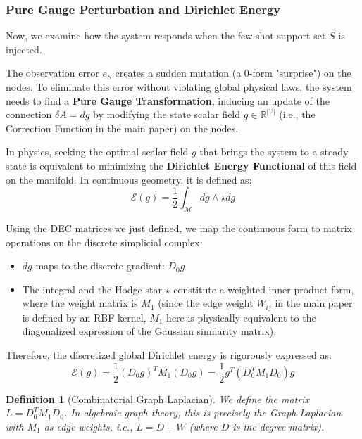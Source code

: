 \documentclass{article}
\newtheorem{definition}{Definition}[section]
\begin{document}
\subsubsection{Pure Gauge Perturbation and Dirichlet Energy}

Now, we examine how the system responds when the few-shot support set $S$ is injected.

The observation error $e_S$ creates a sudden mutation (a 0-form "surprise") on the nodes. To eliminate this error without violating global physical laws, the system needs to find a \textbf{Pure Gauge Transformation}, inducing an update of the connection $\delta A = d g$ by modifying the state scalar field $g \in \mathbb{R}^{|\mathcal{V}|}$ (i.e., the Correction Function in the main paper) on the nodes.

In physics, seeking the optimal scalar field $g$ that brings the system to a steady state is equivalent to minimizing the \textbf{Dirichlet Energy Functional} of this field on the manifold. In continuous geometry, it is defined as:
\begin{equation}
\mathcal{E}(g) = \frac{1}{2} \int_{\mathcal{M}} d g \wedge \star d g
\end{equation}

Using the DEC matrices we just defined, we map the continuous form to matrix operations on the discrete simplicial complex:
\begin{itemize}
    \item $d g$ maps to the discrete gradient: $D_0 g$
    \item The integral and the Hodge star $\star$ constitute a weighted inner product form, where the weight matrix is $M_1$ (since the edge weight $W_{ij}$ in the main paper is defined by an RBF kernel, $M_1$ here is physically equivalent to the diagonalized expression of the Gaussian similarity matrix).
\end{itemize}

Therefore, the discretized global Dirichlet energy is rigorously expressed as:
\begin{equation}
\mathcal{E}(g) = \frac{1}{2} (D_0 g)^T M_1 (D_0 g) = \frac{1}{2} g^T (D_0^T M_1 D_0) g
\end{equation}

\begin{definition}[Combinatorial Graph Laplacian]
We define the matrix $L = D_0^T M_1 D_0$. In algebraic graph theory, this is precisely the Graph Laplacian with $M_1$ as edge weights, i.e., $L = D - W$ (where $D$ is the degree matrix).
\end{definition}
\end{document}
